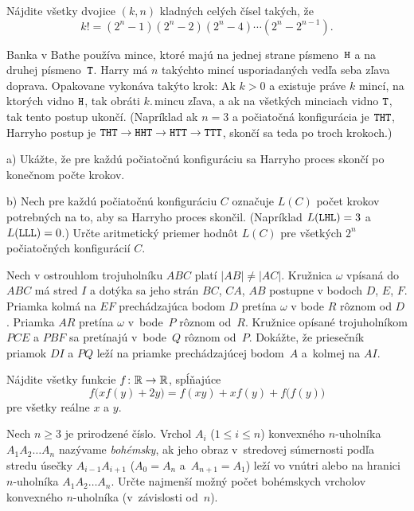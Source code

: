 {%
Nájdite všetky dvojice $(k,n)$ kladných celých čísel
takých, že
$$k!=(2^n-1)(2^n-2)(2^n-4)\cdots(2^n-2^{n-1}).$$
}

{%
Banka v Bathe používa mince,
ktoré majú na jednej strane písmeno~$\text{\tt H}$
a na druhej písmeno~$\text{\tt T}$.
Harry má $n$ takýchto mincí usporiadaných vedľa seba zľava doprava.
Opakovane vykonáva takýto krok:
Ak $k>0$
a existuje práve $k$ mincí, na ktorých vidno $\text{\tt H}$,
tak obráti $k$.\,mincu zľava,
a ak na všetkých minciach vidno $\text{\tt T}$,
tak tento postup ukončí.
(Napríklad ak $n=3$
a počiatočná konfigurácia je
$\text{\tt T}\text{\tt H}\text{\tt T}$,
Harryho postup je
$\text{\tt T}\text{\tt H}\text{\tt T}
\to
\text{\tt H}\text{\tt H}\text{\tt T}
\to
\text{\tt H}\text{\tt T}\text{\tt T}
\to
\text{\tt T}\text{\tt T}\text{\tt T}$,
skončí sa teda po troch krokoch.)
\item{a)} Ukážte, že pre každú počiatočnú konfiguráciu
sa Harryho proces skončí po konečnom počte krokov.
\item{b)} Nech pre každú počiatočnú konfiguráciu $C$
označuje $L(C)$ počet krokov potrebných na to,
aby sa Harryho proces skončil. (Napríklad $L(\text{\tt L}\text{\tt H}\text{\tt L})=3$
a $L(\text{\tt L}\text{\tt L}\text{\tt L})=0$.) 
Určte aritmetický priemer hodnôt $L(C)$ pre všetkých $2^n$ počiatočných konfigurácií $C$.\endgraf
}

{%
Nech v ostrouhlom trojuholníku $ABC$ platí
$|AB|\ne|AC|$.
Kružnica $\omega$ vpísaná do $ABC$ má stred $I$
a dotýka sa jeho strán $BC$, $CA$, $AB$ postupne v bodoch $D$, $E$, $F$.
Priamka kolmá na $EF$ prechádzajúca bodom $D$ pretína $\omega$ v bode $R$ rôznom od $D$.
Priamka $AR$ pretína $\omega$ v~bode~$P$ rôznom od~$R$.
Kružnice opísané trojuholníkom $PCE$ a $PBF$ sa pretínajú v~bode~$Q$ rôznom od~$P$.
Dokážte, že priesečník priamok $DI$ a $PQ$
leží na priamke prechádzajúcej bodom~$A$ a~kolmej na $AI$.}

{%
Nájdite všetky funkcie $f\colon \Bbb R\to\Bbb R$, spĺňajúce
$$
f\bigl(xf(y)+2y\bigr) = f(xy) + xf(y) + f\bigl(f(y)\bigr)
$$
pre všetky reálne $x$ a $y$.}

{%
Nech $n\ge 3$ je prirodzené číslo. Vrchol $A_i$ ($1\le i\le n$) konvexného $n$-uholníka $A_1A_2\ldots A_n$ nazývame {\it bohémsky}, ak jeho obraz v~stredovej súmernosti podľa stredu úsečky $A_{i-1}A_{i+1}$ ($A_0=A_n$ a~$A_{n+1}=A_1$) leží vo vnútri alebo na hranici $n$-uholníka $A_1A_2\ldots A_n$. Určte najmenší možný počet bohémskych vrcholov konvexného $n$-uholníka (v~závislosti od~$n$).}

